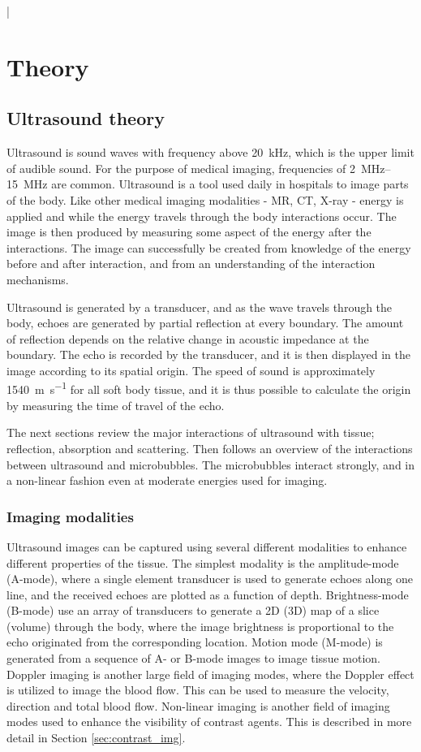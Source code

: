 |%
\section{Theory}
\subsection{Ultrasound theory}
Ultrasound is sound waves with frequency above \SI{20}{\kilo\hertz}, which is the upper limit of audible sound. For the purpose of medical imaging, frequencies of \SIrange{2}{15}{\mega\hertz} are common\cite{Hoskins2010}. Ultrasound is a tool used daily in hospitals to image parts of the body. Like other medical imaging modalities - MR, CT, X-ray - energy is applied and while the energy travels through the body interactions occur. The image is then produced by measuring some aspect of the energy after the interactions. The image can successfully be created from knowledge of the energy before and after interaction, and from an understanding of the interaction mechanisms.

Ultrasound is generated by a transducer, and as the wave travels through the body, echoes are generated by partial reflection at every boundary. The amount of reflection depends on the relative change in acoustic impedance at the boundary. The echo is recorded by the transducer, and it is then displayed in the image according to its spatial origin. The speed of sound is approximately \SI{1540}{\metre\per\second} for all soft body tissue, and it is thus possible to calculate the origin by measuring the time of travel of the echo\cite{Flower2012}. 

The next sections review the major interactions of ultrasound with tissue; reflection, absorption and scattering. Then follows an overview of the interactions between ultrasound and microbubbles. The microbubbles interact strongly, and in a non-linear fashion even at moderate energies used for imaging.

\subsubsection{Imaging modalities}
Ultrasound images can be captured using several different modalities to enhance different properties of the tissue. The simplest modality is the amplitude-mode (A-mode), where a single element transducer is used to generate echoes along one line, and the received echoes are plotted as a function of depth. Brightness-mode (B-mode) use an array of transducers to generate a 2D (3D) map of a slice (volume) through the body, where the image brightness is proportional to the echo originated from the corresponding location. Motion mode (M-mode) is generated from a sequence of A- or B-mode images to image tissue motion. Doppler imaging is another large field of imaging modes, where the Doppler effect is utilized to image the blood flow. This can be used to measure the velocity, direction and total blood flow. Non-linear imaging is another field of imaging modes used to enhance the visibility of contrast agents. This is described in more detail in Section \ref{sec:contrast_img}.

